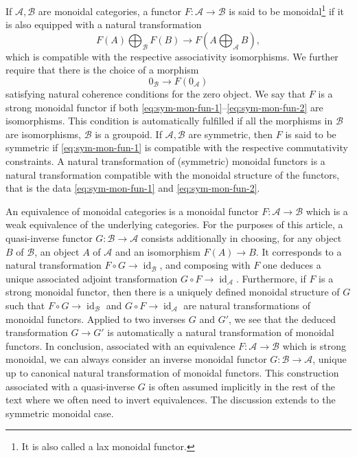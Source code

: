 \documentclass[JEP,XML,SOM,Unicode,published]{cedram}
\theoremstyle{plain}
\theoremstyle{definition}
\newcommand{\Acal}{\mathcal A}
\newcommand{\Bcal}{\mathcal B}
\DeclareMathOperator{\id}{id}
\begin{document}
If $\Acal, \Bcal$ are monoidal categories, a functor $F\colon\Acal\to\Bcal$ is said to be monoidal\footnote{It is also called a lax monoidal functor.} if it is also equipped with a natural transformation
\begin{equation}\label{eq:sym-mon-fun-1}
F(A) \bigoplus_{\Bcal} F(B) \to F(A \bigoplus_\Acal B),
\end{equation}
which is compatible with the respective associativity isomorphisms. We further require that there is the choice of a morphism
\begin{equation}\label{eq:sym-mon-fun-2}
0_\Bcal \to F(0_\Acal)
\end{equation}
satisfying natural coherence conditions for the zero object. We say that $F$ is a strong monoidal functor if both \eqref{eq:sym-mon-fun-1}--\eqref{eq:sym-mon-fun-2} are isomorphisms. This condition is automatically fulfilled if all the morphisms in $\Bcal$ are isomorphisms, \ie $\Bcal$ is a groupoid. If $\Acal, \Bcal$ are symmetric, then $F$ is said to be symmetric if \eqref{eq:sym-mon-fun-1} is compatible with the respective commutativity constraints. A natural transformation of (symmetric) monoidal functors is a natural transformation compatible with the monoidal structure of the functors, that is the data \eqref{eq:sym-mon-fun-1} and \eqref{eq:sym-mon-fun-2}.

An equivalence of monoidal categories is a monoidal functor $F\colon \Acal\to \Bcal$ which is a weak equivalence of the underlying categories. For the purposes of this article, a quasi-inverse functor $G \colon \Bcal \to \Acal$ consists additionally in choosing, for any object $B$ of $\Bcal$, an object $A$ of $\Acal$ and an isomorphism $F(A)\to B$. It corresponds to a natural transformation $F \circ G \to \id_{\Bcal}$, and composing with $F$ one deduces a unique associated adjoint transformation $G \circ F \to \id_{\Acal}$. Furthermore, if $F$ is a strong monoidal functor, then there is a uniquely defined monoidal structure of $G$ such that $F \circ G \to \id_{\Bcal}$ and $G \circ F \to \id_{\Acal}$ are natural transformations of monoidal functors. Applied to two inverses $G$ and $G'$, we see that the deduced transformation $G \to G'$ is automatically a natural transformation of monoidal functors. In conclusion, associated with an equivalence $F \colon \Acal \to \Bcal$ which is strong monoidal, we can always consider an inverse monoidal functor $G \colon \Bcal \to \Acal$, unique up to canonical natural transformation of monoidal functors. This construction associated with a quasi-inverse $G$ is often assumed implicitly in the rest of the text where we often need to invert equivalences. The discussion extends to the symmetric monoidal case.
\end{document}
